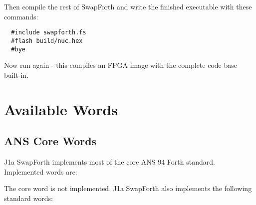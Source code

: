 Then compile the rest of SwapForth and write the finished executable with these commands:

\begin{framed}
\begin{Verbatim}
  #include swapforth.fs
  #flash build/nuc.hex
  #bye
\end{Verbatim}
\end{framed}

Now run  again - this compiles an FPGA image with the complete code base built-in.


\chapter{Available Words}

\section{ANS Core Words} 

J1a SwapForth implements most of the core ANS 94 Forth standard.
Implemented words are:



\noindent
The core word
is not implemented.
J1a SwapForth also implements the following standard words:

